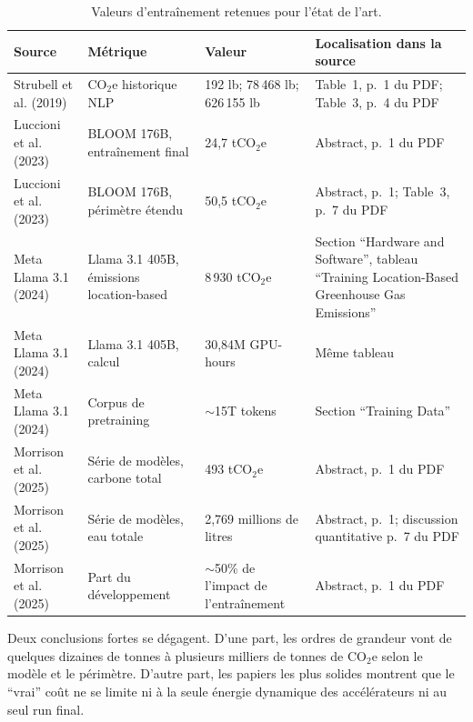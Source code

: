 \documentclass[11pt,a4paper]{article}
\begin{document}
\begin{table}[htbp]
\centering
\begin{tabularx}{\textwidth}{|L{3.3cm}|L{2.3cm}|L{2.6cm}|Y|}
\hline
Source & Métrique & Valeur & Localisation dans la source \\
\hline
Strubell et al. (2019) \cite{strubell2019} & CO$_2$e historique NLP & 192 lb; 78\,468 lb; 626\,155 lb & Table~1, p.~1 du PDF; Table~3, p.~4 du PDF \\
\hline
Luccioni et al. (2023) \cite{luccioni2023} & BLOOM 176B, entraînement final & 24,7 tCO$_2$e & Abstract, p.~1 du PDF \\
\hline
Luccioni et al. (2023) \cite{luccioni2023} & BLOOM 176B, périmètre étendu & 50,5 tCO$_2$e & Abstract, p.~1; Table~3, p.~7 du PDF \\
\hline
Meta Llama 3.1 (2024) \cite{meta2024llama} & Llama 3.1 405B, émissions location-based & 8\,930 tCO$_2$e & Section ``Hardware and Software'', tableau ``Training Location-Based Greenhouse Gas Emissions'' \\
\hline
Meta Llama 3.1 (2024) \cite{meta2024llama} & Llama 3.1 405B, calcul & 30,84M GPU-hours & Même tableau \\
\hline
Meta Llama 3.1 (2024) \cite{meta2024llama} & Corpus de pretraining & $\sim$15T tokens & Section ``Training Data'' \\
\hline
Morrison et al. (2025) \cite{morrison2025} & Série de modèles, carbone total & 493 tCO$_2$e & Abstract, p.~1 du PDF \\
\hline
Morrison et al. (2025) \cite{morrison2025} & Série de modèles, eau totale & 2,769 millions de litres & Abstract, p.~1; discussion quantitative p.~7 du PDF \\
\hline
Morrison et al. (2025) \cite{morrison2025} & Part du développement & $\sim$50\% de l'impact de l'entraînement & Abstract, p.~1 du PDF \\
\hline
\end{tabularx}
\caption{Valeurs d'entraînement retenues pour l'état de l'art.}
\label{tab:training}
\end{table}

Deux conclusions fortes se dégagent. D'une part, les ordres de grandeur vont de quelques dizaines de tonnes à plusieurs milliers de tonnes de CO$_2$e selon le modèle et le périmètre. D'autre part, les papiers les plus solides montrent que le ``vrai'' coût ne se limite ni à la seule énergie dynamique des accélérateurs ni au seul run final.
\end{document}
